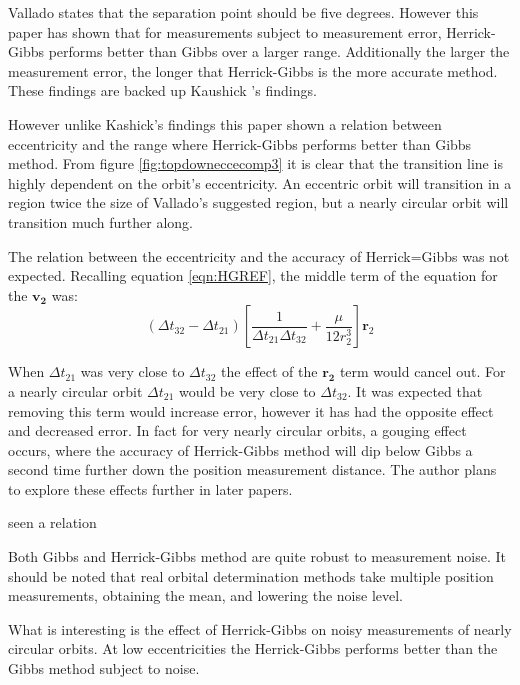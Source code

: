 \documentclass[12pt]{article}
\begin{document}
	Vallado states that \cite{vallado2007fundamentals} the separation point should be five degrees. However this paper has shown that for measurements subject to measurement error, Herrick-Gibbs performs better than Gibbs over a larger range. Additionally the larger the measurement error, the longer that Herrick-Gibbs is the more accurate method. These findings are backed up Kaushick \cite{Kaushick}'s findings.\par 
	However unlike Kashick's findings  this paper shown a relation between eccentricity and the range where Herrick-Gibbs performs better than Gibbs method. From figure \ref{fig:topdowneccecomp3} it is clear that the transition line is highly dependent on the orbit's eccentricity. An eccentric orbit will transition in a region twice the size of  Vallado's suggested region, but a nearly circular orbit will transition much further along.
	
	The relation between the eccentricity and the accuracy of Herrick=Gibbs was not expected. Recalling equation \ref{eqn:HGREF}, the middle term of the equation for the $\mathbf{ v_2 }$ was: 
	\begin{equation}
	\left( \Delta t _ { 32 } - \Delta t _ { 21 } \right) \left[ \frac { 1 } { \Delta t _ { 21 } \Delta t _ { 32 } } + \frac { \mu } { 12 r _ { 2 } ^ { 3 } } \right] \mathbf { r } _ { 2 }
	\end{equation}
	
	When $ \Delta t _ { 21 }$ was very close to $ \Delta t _ { 32 } $ the effect of the $\mathbf{r_2}$ term would cancel out. For a nearly circular orbit $ \Delta t _ { 21 }$ would be very close to $ \Delta t _ { 32 } $. It was expected that removing this term would increase error, however it has had the opposite effect and decreased error. In fact for very nearly circular orbits, a gouging effect occurs, where the accuracy of Herrick-Gibbs method will dip below Gibbs a second time further down the position measurement distance. The author plans to explore these effects further in later papers.
	
	
	
	
	\iffalse
	
	 seen a relation 
	
	
	Both Gibbs and Herrick-Gibbs method are quite robust to measurement noise. It should be noted that real orbital determination methods take multiple position measurements, obtaining the mean, and lowering the noise level. \par 
	
	What is interesting is the effect of Herrick-Gibbs on noisy measurements of nearly circular orbits. At low eccentricities the Herrick-Gibbs performs better than the Gibbs method subject to noise. 
	
\end{document}
